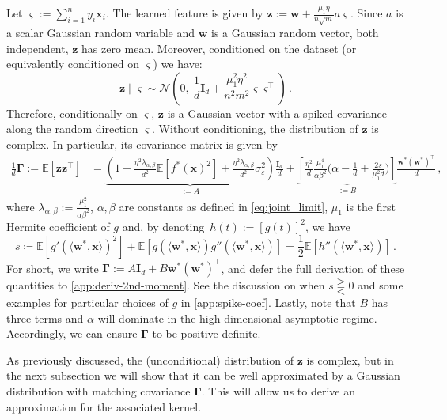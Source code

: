 Let $\bm \varsigma := \sum_{i=1}^n y_i \bm x_i$. The learned feature is given by $\bm z := \bm w + \frac{\mu_1\eta}{n \sqrt{m}}a\bm \varsigma$. Since $a$ is a scalar Gaussian random variable and $\bm w$ is a Gaussian random vector, both independent, $\bm z$ has zero mean. Moreover, conditioned on the dataset (or equivalently conditioned on $\bm \varsigma$) we have:
\begin{equation*}
    \bm z \mid \bm \varsigma \sim \mathcal{N}\!\left(0,\ \frac{1}{d} \bm I_d + \frac{\mu_1^2 \eta^2}{n^2 m^2} \bm \varsigma \bm \varsigma^\top \right)\,.
\end{equation*}
Therefore, conditionally on $\bm \varsigma$, $\bm z$ is a Gaussian vector with a spiked covariance along the random direction $\bm \varsigma$. Without conditioning, the distribution of $\bm z$ is complex. In particular, its covariance matrix is given by 
\begin{equation}\label{eq:covz}
\begin{split}
   \frac{1}{d}\bm \Gamma := \mathbb E[\bm z\bm z^\top] & = \underbrace{\left( 1 + \frac{\eta^2\lambda_{\alpha, \beta}}{d^2}\mathbb E[f^*(\bm x)^2] + \frac{\eta^2\lambda_{\alpha, \beta}}{d^2}\sigma_\varepsilon^2\right)}_{:= A} \frac{\bm I_d}{d} + \underbrace{\left[\frac{\eta^2}{d}\frac{\mu_1^4}{\alpha \beta^2}\Big(\alpha - \frac{1}{d} + \frac{2s}{\mu_1^2d}\Big)\right]}_{:=B} \frac{\bm w^* (\bm w^*)^\top}{d} \,,
\end{split}
\end{equation}
where $\lambda_{\alpha, \beta} := \frac{\mu_1^2}{\alpha \beta^2}$, $\alpha, \beta$ are constants as defined in \cref{eq:joint_limit}, $\mu_1$ is the first Hermite coefficient of $g$ and,  by denoting~$h(t):=[g(t)]^2$, we have
\[
    s \coloneqq \mathbb E[g'(\langle \bm w^*,\bm x\rangle)^2]+ \mathbb E[g(\langle \bm w^*,\bm x\rangle)g''(\langle \bm w^*,\bm x\rangle)] = \frac{1}{2} \mathbb{E}[h''(\langle \bm w^*,\bm x\rangle)]\,.
\]
For short, we write $\bm \Gamma := A\bm I_d + B \bm w^* (\bm w^*)^\top$, and defer the full derivation of these quantities to \cref{app:deriv-2nd-moment}. See the discussion on when $s \gtreqqless 0$ and some examples for particular choices of $g$ in \cref{app:spike-coef}. Lastly, note that $B$ has three terms and $\alpha$ will dominate in the high-dimensional asymptotic regime.
Accordingly, we can ensure $\bm \Gamma$ to be positive definite.

As previously discussed, the (unconditional) distribution of $\bm z$ is complex, but in the next subsection we will show that it can be well approximated by a Gaussian distribution with matching covariance $\bm \Gamma$. This will allow us to derive an approximation for the associated kernel.

